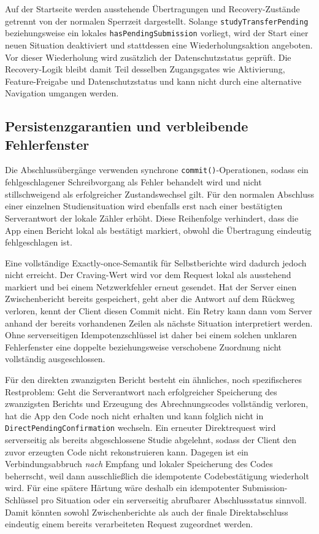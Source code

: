 \begin{neu}
Auf der Startseite werden ausstehende Übertragungen und Recovery-Zustände getrennt von der normalen Sperrzeit dargestellt. Solange \texttt{studyTransferPending} beziehungsweise ein lokales \texttt{hasPendingSubmission} vorliegt, wird der Start einer neuen Situation deaktiviert und stattdessen eine Wiederholungsaktion angeboten. Vor dieser Wiederholung wird zusätzlich der Datenschutzstatus geprüft. Die Recovery-Logik bleibt damit Teil desselben Zugangsgates wie Aktivierung, Feature-Freigabe und Datenschutzstatus und kann nicht durch eine alternative Navigation umgangen werden.

\subsection{Persistenzgarantien und verbleibende Fehlerfenster}

Die Abschlussübergänge verwenden synchrone \texttt{commit()}-Operationen, sodass ein fehlgeschlagener Schreibvorgang als Fehler behandelt wird und nicht stillschweigend als erfolgreicher Zustandswechsel gilt. Für den normalen Abschluss einer einzelnen Studiensituation wird ebenfalls erst nach einer bestätigten Serverantwort der lokale Zähler erhöht. Diese Reihenfolge verhindert, dass die App einen Bericht lokal als bestätigt markiert, obwohl die Übertragung eindeutig fehlgeschlagen ist.

Eine vollständige Exactly-once-Semantik für Selbstberichte wird dadurch jedoch nicht erreicht. Der Craving-Wert wird vor dem Request lokal als ausstehend markiert und bei einem Netzwerkfehler erneut gesendet. Hat der Server einen Zwischenbericht bereits gespeichert, geht aber die Antwort auf dem Rückweg verloren, kennt der Client diesen Commit nicht. Ein Retry kann dann vom Server anhand der bereits vorhandenen Zeilen als nächste Situation interpretiert werden. Ohne serverseitigen Idempotenzschlüssel ist daher bei einem solchen unklaren Fehlerfenster eine doppelte beziehungsweise verschobene Zuordnung nicht vollständig ausgeschlossen.

Für den direkten zwanzigsten Bericht besteht ein ähnliches, noch spezifischeres Restproblem: Geht die Serverantwort nach erfolgreicher Speicherung des zwanzigsten Berichts und Erzeugung des Abrechnungscodes vollständig verloren, hat die App den Code noch nicht erhalten und kann folglich nicht in \texttt{DirectPendingConfirmation} wechseln. Ein erneuter Direktrequest wird serverseitig als bereits abgeschlossene Studie abgelehnt, sodass der Client den zuvor erzeugten Code nicht rekonstruieren kann. Dagegen ist ein Verbindungsabbruch \emph{nach} Empfang und lokaler Speicherung des Codes beherrscht, weil dann ausschließlich die idempotente Codebestätigung wiederholt wird. Für eine spätere Härtung wäre deshalb ein idempotenter Submission-Schlüssel pro Situation oder ein serverseitig abrufbarer Abschlussstatus sinnvoll. Damit könnten sowohl Zwischenberichte als auch der finale Direktabschluss eindeutig einem bereits verarbeiteten Request zugeordnet werden.


\end{neu}
